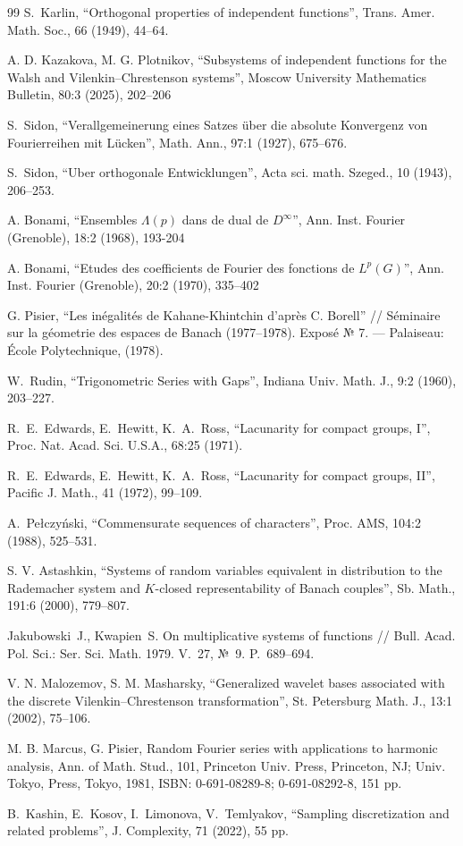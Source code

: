 \documentclass[12pt]{article}
\begin{document}
\begin{thebibliography}{99}
		S.~Karlin, “Orthogonal properties of independent functions”, Trans. Amer. Math. Soc., 66 (1949), 44–64.
		
		A. D. Kazakova, M. G. Plotnikov, “Subsystems of independent functions for the Walsh and Vilenkin–Chrestenson systems”, Moscow University Mathematics Bulletin, 80:3 (2025), 202–206
		
		S.~Sidon, “Verallgemeinerung eines Satzes über die absolute Konvergenz von Fourierreihen mit Lücken”, Math. Ann., 97:1 (1927), 675–676.
		
		S.~Sidon, “Uber orthogonale Entwicklungen”, Acta sci. math. Szeged., 10 (1943), 206–253.
				
		A. Bonami, “Ensembles $\Lambda(p)$ dans de dual de $D^\infty$”, Ann. Inst. Fourier (Grenoble), 18:2 (1968), 193-204 
		
		A. Bonami, “Etudes des coefficients de Fourier des fonctions 
		de $L^p (G)$”, Ann. Inst. Fourier (Grenoble), 20:2 (1970), 335--402
		
		 G. Pisier,  “Les inégalités de Kahane-Khintchin d'après C. Borell” // Séminaire sur la géometrie des espaces de Banach (1977--1978). Exposé № 7. --- Palaiseau: École Polytechnique, (1978).
		
		W.~Rudin, “Trigonometric Series with Gaps”, Indiana Univ. Math. J., 9:2 (1960), 203–227.
		
		R.~E.~Edwards, E.~Hewitt, K.~A.~Ross, “Lacunarity for compact groups, I”, Proc. Nat. Acad. Sci. U.S.A., 68:25 (1971).
		
		R.~E.~Edwards, E.~Hewitt, K.~A.~Ross, “Lacunarity for compact groups, II”, Pacific J. Math., 41 (1972), 99–109.
		
		A.~Pełczyński, “Commensurate sequences of characters”, Proc. AMS, 104:2 (1988), 525–531.

S. V. Astashkin, “Systems of random variables equivalent in distribution to the Rademacher system and $K$-closed representability of Banach couples”, Sb. Math., 191:6 (2000), 779–807.
		
		Jakubowski~J., Kwapien~S. On multiplicative systems of functions // Bull. Acad. Pol. Sci.: Ser. Sci. Math. 1979. V.~27, №~9. P.~689--694.
		
		 V. N. Malozemov, S. M. Masharsky, “Generalized wavelet bases associated with the discrete Vilenkin–Chrestenson transformation”, St. Petersburg Math. J., 13:1 (2002), 75–106.
		
		
		M. B. Marcus, G. Pisier, Random Fourier series with applications to harmonic analysis, Ann. of Math. Stud., 101, Princeton Univ. Press, Princeton, NJ; Univ. Tokyo, Press, Tokyo, 1981, ISBN: 0-691-08289-8; 0-691-08292-8, 151 pp.
		
		B.~Kashin, E.~Kosov, I.~Limonova, V.~Temlyakov, “Sampling discretization and related problems”, J. Complexity, 71 (2022), 55 pp.
		
		
	\end{thebibliography}
\end{document}
